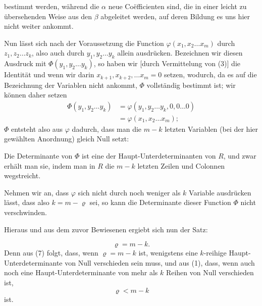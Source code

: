 
bestimmt werden, während die $\alpha$ neue Coëfficienten sind, die in
einer leicht zu übersehenden Weise aus den $\beta$ abgeleitet werden,
auf deren Bildung es uns hier nicht weiter ankommt.

Nun lässt sich nach der Voraussetzung die Function
$\varphi(x_1, x_2 \ldots x_m)$ durch $z_1, z_2 \ldots z_k$, also auch durch $y_1, y_2 \ldots y_k$
allein ausdrücken. Bezeichnen wir diesen Ausdruck mit
$\Phi(y_1, y_2 \ldots y_k)$, so haben wir [durch Vermittelung von (3)] die
Identität
und wenn wir darin $x_{k+1}, x_{k+2}, \ldots x_m = 0$ setzen,
wodurch, da es auf die Bezeichnung der Variablen nicht ankommt,
$\Phi$ vollständig bestimmt ist; wir können daher setzen
\begin{align}
\Phi(y_1, y_2 \ldots y_k) &= \varphi(y_1, y_2 \ldots y_k, 0, 0 \ldots 0) \tag{6}\\
&= \varphi(x_1, x_2 \ldots x_m);
\end{align}
$\Phi$ entsteht also aus $\varphi$ dadurch, dass man die $m-k$ letzten
Variablen (bei der hier gewählten Anordnung) gleich Null setzt:

Die Determinante von $\Phi$ ist eine der Haupt-Unterdeterminanten von $R$, und zwar erhält man sie, indem man in $R$ die
$m-k$ letzten Zeilen und Colonnen wegstreicht.

Nehmen wir an, dass $\varphi$ sich nicht durch noch weniger als
$k$ Variable ausdrücken lässt, dass also $k = m - \varrho$ sei, so kann
die Determinante dieser Function $\Phi$ nicht verschwinden.

Hieraus und aus dem zuvor Bewiesenen ergiebt sich nun
der Satz:

 
\[
\varrho = m - k.
\]
Denn aus (7) folgt, dass, wenn $\varrho = m - k$ ist, wenigstens
eine $k$-reihige Haupt-Unterdeterminante von Null verschieden
sein muss, und aus (1), dass, wenn auch noch eine Haupt-Unterdeterminante von mehr als $k$ Reihen von Null verschieden ist,
\[
\varrho < m - k
\]
ist.

